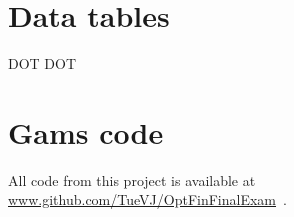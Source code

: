 
\section{Data tables\label{sec:appendixdata}}

DOT DOT

\section{Gams code\label{sec:appendixcode}}

All code from this project is available at \url{www.github.com/TueVJ/OptFinFinalExam}~.
